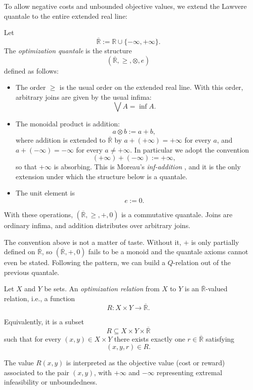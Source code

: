 To allow negative costs and unbounded objective values, we extend the Lawvere
quantale to the entire extended real line:

\begin{definition}
	Let
	\[
		\overline{\mathbb{R}} := \mathbb{R} \cup \{-\infty,+\infty\}.
	\]
	The \emph{optimization quantale} is the structure
	\[
		(\overline{\mathbb{R}},\geq,\otimes,e)
	\]
	defined as follows:

	\begin{itemize}
		\item The order $\geq$ is the usual order on the extended real line.
		      With this order, arbitrary joins are given by the usual infima:
		      \[
			      \bigvee A = \inf A.
		      \]

		\item The monoidal product is addition:
		      \[
			      a \otimes b := a + b,
		      \]
		      where addition is extended to $\overline{\mathbb{R}}$ by
		      $a + (+\infty) = +\infty$ for every $a$, and
		      $a + (-\infty) = -\infty$ for every $a \neq +\infty$.
		      In particular we adopt the convention
		      \[
			      (+\infty) + (-\infty) := +\infty,
		      \]
		      so that $+\infty$ is absorbing. This is Moreau's
		      \emph{inf-addition} \cite{rockafellar1970convex}, and it is the
		      only extension under which the structure below is a quantale.

		\item The unit element is
		      \[
			      e := 0.
		      \]
	\end{itemize}

	With these operations,
	$(\overline{\mathbb{R}},\geq,+,0)$
	is a commutative quantale. Joins are ordinary infima,
	and addition distributes over arbitrary joins.
\end{definition}

The convention above is not a matter of taste. Without it, $+$ is only
partially defined on $\overline{\mathbb{R}}$, so
$(\overline{\mathbb{R}},+,0)$ fails to be a monoid and the quantale axioms
cannot even be stated. Following the pattern, 
we can build a $Q$-relation out of the previous quantale.

\begin{definition}
	Let $X$ and $Y$ be sets.
	An \emph{optimization relation} from $X$ to $Y$ is an
	$\overline{\mathbb{R}}$-valued relation, i.e., a function
	\[
		R : X \times Y \to \overline{\mathbb{R}}.
	\]

	Equivalently, it is a subset
	\[
		R \subseteq X \times Y \times \overline{\mathbb{R}}
	\]
	such that for every $(x,y) \in X \times Y$ there exists exactly one
	$r \in \overline{\mathbb{R}}$ satisfying
	\[
		(x,y,r) \in R.
	\]

	The value $R(x,y)$ is interpreted as the objective value
	(cost or reward) associated to the pair $(x,y)$,
	with $+\infty$ and $-\infty$ representing extremal infeasibility
	or unboundedness.
\end{definition}

